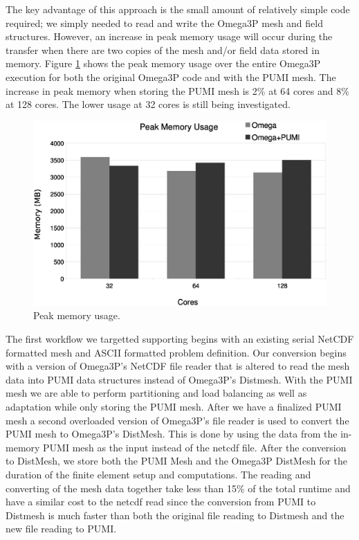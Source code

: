\documentclass[a4paper]{article}
\begin{document}
The key advantage of this approach is the small amount of relatively simple code
required; we simply needed to read and write the Omega3P mesh and field structures.
However, an increase in peak memory usage will occur during the transfer when
there are two copies of the mesh and/or field data stored in memory.
Figure \ref{fig:memusage} shows the peak memory usage over the entire Omega3P
execution for both the original Omega3P code and with the PUMI mesh.
The increase in peak memory when storing the PUMI mesh is 2\% at 64 cores and
8\% at 128 cores.
The lower usage at 32 cores is still being investigated.

\begin{figure}[ht]
\centering
  \includegraphics[width=\textwidth]{peak-memory-usage.eps}
  \caption{\label{fig:memusage} Peak memory usage.}
\end{figure}

The first workflow we targetted supporting begins with an existing serial NetCDF
formatted mesh and ASCII formatted problem definition.
Our conversion begins with a version of Omega3P's NetCDF file reader that is altered 
to read the mesh data into PUMI data structures instead of Omega3P's Distmesh. With 
the PUMI mesh we are able to perform partitioning and load balancing as well as adaptation 
while only storing the PUMI mesh. After we have a finalized PUMI mesh a second 
overloaded version of Omega3P's file reader is used to convert the PUMI mesh to 
Omega3P's DistMesh. This is done by using the data from the in-memory PUMI mesh as the 
input instead of the netcdf file. After the conversion to DistMesh, we store both the 
PUMI Mesh and the Omega3P DistMesh for the duration of the finite element setup and 
computations. The reading and converting of the mesh data together take less than 15\% 
of the total runtime and have a similar cost to the netcdf read since the conversion 
from PUMI to Distmesh is much faster than both the original file reading to Distmesh 
and the new file reading to PUMI. 
\end{document}

